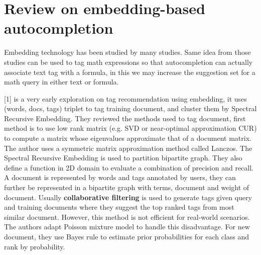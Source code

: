 \documentclass[12pt]{article} %
\begin{document}
\section*{Review on embedding-based autocompletion} %

Embedding technology has been studied by many studies.
Same idea from those studies can be used to tag math expressions so that autocompletion can actually associate text tag with a formula, in this we may increase the suggestion set for a math query in either text or formula.

[1] is a very early exploration on tag recommendation using embedding, 
it uses (words, docs, tags) triplet to tag training document, and cluster them by Spectral Recursive Embedding.
They reviewed the methods used to tag document, first method is to use low rank matrix (e.g. SVD or near-optimal approximation CUR) to compute a matrix whose eigenvalues approximate that of a document matrix. The author uses a symmetric matrix approximation method called Lanczos. The Spectral Recursive Embedding is used to partition bipartite graph. They also define a function in 2D domain to evaluate a combination of precision and recall.
A document is represented by words and tags annotated by users, they can further be represented in a bipartite graph with terms, document and weight of document.
Usually \textbf{collaborative filtering} is used to generate tags given query and training documents where they suggest the top ranked tags from most similar document. However, this method is not efficient for real-world scenarios. The authors adapt Poisson mixture model to handle this disadvantage.
For new document, they use Bayes rule to estimate prior probabilities for each class and rank by probability.
\end{document}
